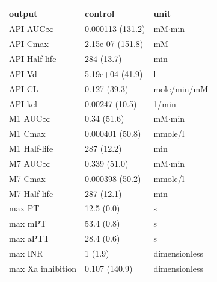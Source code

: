 \begin{tabular}{lll}
\toprule
output & control & unit \\
\midrule
API AUC$\infty$ & 0.000113 (131.2) & mM$\cdot$min \\
API Cmax & 2.15e-07 (151.8) & mM \\
API Half-life & 284 (13.7) & min \\
API Vd & 5.19e+04 (41.9) & l \\
API CL & 0.127 (39.3) & mole/min/mM \\
API kel & 0.00247 (10.5) & 1/min \\
M1 AUC$\infty$ & 0.34 (51.6) & mM$\cdot$min \\
M1 Cmax & 0.000401 (50.8) & mmole/l \\
M1 Half-life & 287 (12.2) & min \\
M7 AUC$\infty$ & 0.339 (51.0) & mM$\cdot$min \\
M7 Cmax & 0.000398 (50.2) & mmole/l \\
M7 Half-life & 287 (12.1) & min \\
max PT & 12.5 (0.0) & s \\
max mPT & 53.4 (0.8) & s \\
max aPTT & 28.4 (0.6) & s \\
max INR & 1 (1.9) & dimensionless \\
max Xa inhibition & 0.107 (140.9) & dimensionless \\
\bottomrule
\end{tabular}

